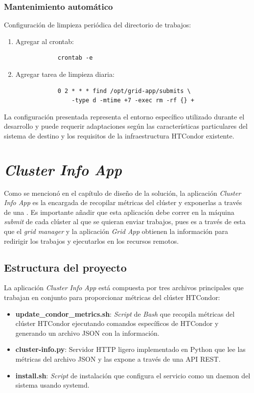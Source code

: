 \subsubsection{Mantenimiento automático}
\noindent

Configuración de limpieza periódica del directorio de trabajos:

\begin{enumerate}
	\item Agregar al crontab:
	      \begin{verbatim}
			crontab -e
		\end{verbatim}

	\item Agregar tarea de limpieza diaria:
	      \begin{verbatim}
			0 2 * * * find /opt/grid-app/submits \
				-type d -mtime +7 -exec rm -rf {} +
		\end{verbatim}
\end{enumerate}

La configuración presentada representa el entorno específico utilizado durante el desarrollo y puede requerir adaptaciones según las características particulares del sistema de destino y los requisitos de la infraestructura HTCondor existente.

\section{\textit{Cluster Info App}}
\noindent

Como se mencionó en el capítulo de diseño de la solución, la aplicación \textit{Cluster Info App} es la encargada de recopilar métricas del clúster y exponerlas a través de una \API. Es importante añadir que esta aplicación debe correr en la máquina \textit{submit} de cada clúster al que se quieran enviar trabajos, pues es a través de esta que el \textit{grid manager} y la aplicación \textit{Grid App} obtienen la información para redirigir los trabajos y ejecutarlos en los recursos remotos.

\subsection{Estructura del proyecto}
\noindent
La aplicación \textit{Cluster Info App} está compuesta por tres archivos principales que trabajan en conjunto para proporcionar métricas del clúster HTCondor:

\begin{itemize}
	\item \textbf{update\_condor\_metrics.sh}: \textit{Script} de \textit{Bash} que recopila métricas del clúster HTCondor ejecutando comandos específicos de HTCondor y generando un archivo JSON con la información.
	\item \textbf{cluster-info.py}: Servidor HTTP ligero implementado en Python que lee las métricas del archivo JSON y las expone a través de una API REST.
	\item \textbf{install.sh}: \textit{Script} de instalación que configura el servicio como un daemon del sistema usando systemd.
\end{itemize}

